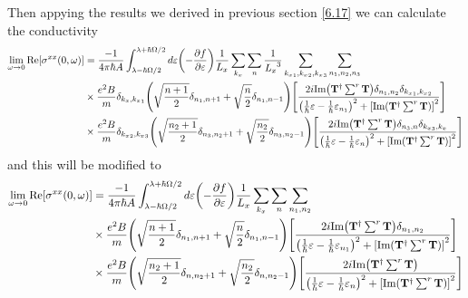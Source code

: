 \noindent
Then appying the results we derived in previous section \eqref{6.17} we can calculate the conductivity
\begin{equation} \label{7.6}
  \begin{aligned}
    \lim_{\omega \to 0}
    \text{Re}[{\sigma}^{xx}(0,\omega)] & =
    \frac{-1}{4\pi\hbar A}
    \int_{\lambda-\hbar\Omega/2}^{\lambda+ \hbar\Omega/2} d\varepsilon
    \qty(
    -\frac{\partial f}{\partial \varepsilon})
    \frac{1}{L_x} \sum_{k_x} \sum_{n}
    \frac{1}{{L_x}^3} \sum_{{k_x}_1,{k_x}_2,{k_x}_3}
    \sum_{n_1,n_2,n_3}
    \\
    & \times
    \frac{e^2B}{{m}}
    \delta_{k_x,{k_x}_1}
    \qty(\sqrt{\frac{n+1}{2}} \delta_{n_1,n+1} + \sqrt{\frac{n}{2}}
    \delta_{n_1,n-1})
    \qty[
    \frac{2i \text{Im}\qty(\mathbf{T}^{\dagger} \sum^r \mathbf{T})
    \delta_{n_1,n_2}\delta_{{k_x}_1,{k_x}_2}}
    {
    \qty(
    \frac{1}{\hbar}\varepsilon -
    \frac{1}{\hbar}\varepsilon_{n_1}
    )^2
    + \qty[\text{Im}\qty(\mathbf{T}^{\dagger} \sum^r \mathbf{T})]^2
    }] \\
    & \times
    \frac{e^2B}{{m}}
    \delta_{{k_x}_2,{k_x}_3}
    \qty(\sqrt{\frac{n_2+1}{2}} \delta_{n_3,n_2+1} + \sqrt{\frac{n_2}{2}}
    \delta_{n_3,n_2-1})
    \qty[
    \frac{2i \text{Im}\qty(\mathbf{T}^{\dagger} \sum^r \mathbf{T})
    \delta_{n_3,n}\delta_{{k_x}_3,{k_x}}}
    {
    \qty(
    \frac{1}{\hbar}\varepsilon -
    \frac{1}{\hbar}\varepsilon_{n}
    )^2
    + \qty[\text{Im}\qty(\mathbf{T}^{\dagger} \sum^r \mathbf{T})]^2
    }]
  \end{aligned}
\end{equation}
and this will be modified to
\begin{equation} \label{7.7}
  \begin{aligned}
    \lim_{\omega \to 0}
    \text{Re}[{\sigma}^{xx}(0,\omega)] & =
    \frac{-1}{4\pi\hbar A}
    \int_{\lambda-\hbar\Omega/2}^{\lambda+ \hbar\Omega/2} d\varepsilon
    \qty(
    -\frac{\partial f}{\partial \varepsilon})
    \frac{1}{L_x} \sum_{k_x} \sum_{n}
    \sum_{n_1,n_2}
    \\
    & \times
    \frac{e^2B}{{m}}
    \qty(\sqrt{\frac{n+1}{2}} \delta_{n_1,n+1} + \sqrt{\frac{n}{2}}
    \delta_{n_1,n-1})
    \qty[
    \frac{2i \text{Im}\qty(\mathbf{T}^{\dagger} \sum^r \mathbf{T})
    \delta_{n_1,n_2}}
    {
    \qty(
    \frac{1}{\hbar}\varepsilon -
    \frac{1}{\hbar}\varepsilon_{n_1}
    )^2
    + \qty[\text{Im}\qty(\mathbf{T}^{\dagger} \sum^r \mathbf{T})]^2
    }] \\
    & \times
    \frac{e^2B}{{m}}
    \qty(\sqrt{\frac{n_2+1}{2}} \delta_{n,n_2+1} + \sqrt{\frac{n_2}{2}}
    \delta_{n,n_2-1})
    \qty[
    \frac{2i \text{Im}\qty(\mathbf{T}^{\dagger} \sum^r \mathbf{T})
    }
    {
    \qty(
    \frac{1}{\hbar}\varepsilon -
    \frac{1}{\hbar}\varepsilon_{n}
    )^2
    + \qty[\text{Im}\qty(\mathbf{T}^{\dagger} \sum^r \mathbf{T})]^2
    }]
  \end{aligned}
\end{equation}
